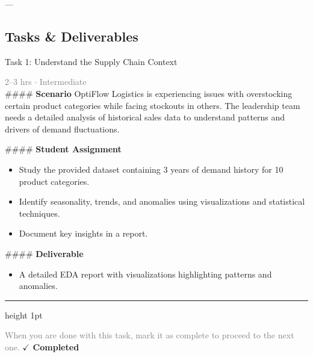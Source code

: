 \documentclass[10pt,a4paper]{article}
\begin{document}
---

\subsection*{Tasks \& Deliverables}

\begin{taskbox}{Task 1: Understand the Supply Chain Context}

    {\small \textcolor{gray}{2--3 hrs $\cdot$ Intermediate}}\\[12pt]

    \#\#\#\# \textbf{Scenario}  
OptiFlow Logistics is experiencing issues with overstocking certain product categories while facing stockouts in others. The leadership team needs a detailed analysis of historical sales data to understand patterns and drivers of demand fluctuations.

\#\#\#\# \textbf{Student Assignment}  
\begin{itemize}
    \item Study the provided dataset containing 3 years of demand history for 10 product categories.  
    \item Identify seasonality, trends, and anomalies using visualizations and statistical techniques.  
    \item Document key insights in a report.  
\end{itemize}

\#\#\#\# \textbf{Deliverable}  
\begin{itemize}
    \item A detailed EDA report with visualizations highlighting patterns and anomalies.\par
\end{itemize}

    \vspace{16pt}

    \textcolor{cardBorder}{\hrule height 1pt}\vspace{8pt}

    \small \textcolor{gray}{When you are done with this task, mark it as complete to proceed to the next one.} \hfill \textbf{\textcolor{brandDark}{$\checkmark$ Completed}}

\end{taskbox}
\end{document}
